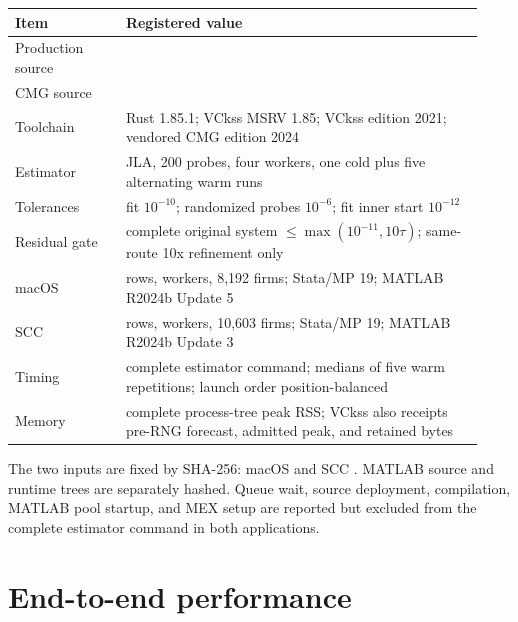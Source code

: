 \documentclass[10pt]{article}
\begin{document}
\begin{tabular}{>{\raggedright\arraybackslash}p{0.22\linewidth}p{0.71\linewidth}}
\toprule
Item & Registered value \\
\midrule
Production source & \texttt{\footnotesize\expandafter\seqsplit\expandafter{\RuntimeCommit}} \\
CMG source & \texttt{\footnotesize\expandafter\seqsplit\expandafter{\CmgCommit}} \\
Toolchain & Rust 1.85.1; VCkss MSRV 1.85; VCkss edition 2021; vendored CMG edition 2024 \\
Estimator & JLA, 200 probes, four workers, one cold plus five alternating warm runs \\
Tolerances & fit $10^{-10}$; randomized probes $10^{-6}$; fit inner start $10^{-12}$ \\
Residual gate & complete original system $\leq\max(10^{-11},10\tau)$; same-route 10x refinement only \\
macOS & \MacRows{} rows, \MacWorkers{} workers, 8,192 firms; Stata/MP 19; MATLAB R2024b Update 5 \\
SCC & \SccRows{} rows, \SccWorkers{} workers, 10,603 firms; Stata/MP 19; MATLAB R2024b Update 3 \\
Timing & complete estimator command; medians of five warm repetitions; launch order position-balanced \\
Memory & complete process-tree peak RSS; VCkss also receipts pre-RNG forecast, admitted peak, and retained bytes \\
\bottomrule
\end{tabular}

The two inputs are fixed by SHA-256: macOS
\texttt{\footnotesize\MacInputSha} and SCC
\texttt{\footnotesize\SccInputSha}. MATLAB source and runtime trees are
separately hashed. Queue wait, source deployment, compilation, MATLAB pool
startup, and MEX setup are reported but excluded from the complete estimator
command in both applications.

\section{End-to-end performance}
\end{document}

